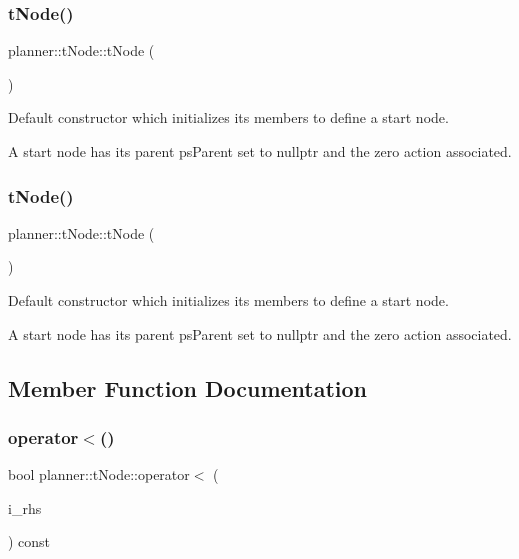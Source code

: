 \subsubsection{\texorpdfstring{t\+Node()}{tNode()}\hspace{0.1cm}{\footnotesize\ttfamily [1/2]}}
{\footnotesize\ttfamily planner\+::t\+Node\+::t\+Node (\begin{DoxyParamCaption}{ }\end{DoxyParamCaption})\hspace{0.3cm}{\ttfamily [inline]}}



Default constructor which initializes its members to define a start node. 

A start node has its parent ps\+Parent set to nullptr and the zero action associated. \mbox{\label{structplanner_1_1t_node_a83ff217ef060b93698045b2357999594}} 
\subsubsection{\texorpdfstring{t\+Node()}{tNode()}\hspace{0.1cm}{\footnotesize\ttfamily [2/2]}}
{\footnotesize\ttfamily planner\+::t\+Node\+::t\+Node (\begin{DoxyParamCaption}{ }\end{DoxyParamCaption})\hspace{0.3cm}{\ttfamily [inline]}}



Default constructor which initializes its members to define a start node. 

A start node has its parent ps\+Parent set to nullptr and the zero action associated. 

\subsection{Member Function Documentation}
\mbox{\label{structplanner_1_1t_node_a5085f3fcf4a960ed9fe14068f1b5e950}} 
\subsubsection{\texorpdfstring{operator$<$()}{operator<()}\hspace{0.1cm}{\footnotesize\ttfamily [1/2]}}
{\footnotesize\ttfamily bool planner\+::t\+Node\+::operator$<$ (\begin{DoxyParamCaption}\item[{const \mbox{\hyperlink{structplanner_1_1t_node}{t\+Node}} \&}]{i\+\_\+rhs }\end{DoxyParamCaption}) const\hspace{0.3cm}{\ttfamily [inline]}}



